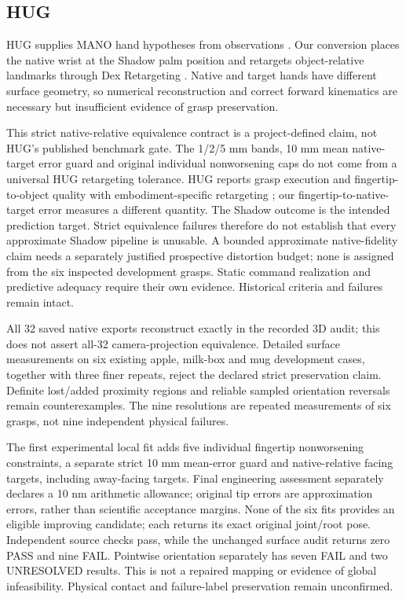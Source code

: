 \subsection{HUG}
HUG supplies MANO hand hypotheses from observations \cite{hug}. Our conversion
places the native wrist at the Shadow palm position and retargets object-relative
landmarks through Dex Retargeting \cite{dex}. Native and target hands have
different surface geometry, so numerical reconstruction and correct forward
kinematics are necessary but insufficient evidence of grasp preservation.

This strict native-relative equivalence contract is a project-defined claim,
not HUG's published benchmark gate. The 1/2/5 mm bands, 10 mm mean
native-target error guard and original individual nonworsening caps do not
come from a universal HUG retargeting tolerance. HUG reports grasp execution
and fingertip-to-object quality with embodiment-specific retargeting
\cite{hug}; our fingertip-to-native-target error measures a different quantity.
The Shadow outcome is the intended prediction target. Strict equivalence
failures therefore do not establish that every approximate Shadow pipeline is
unusable. A bounded approximate native-fidelity claim needs a separately
justified prospective distortion budget; none is assigned from the six
inspected development grasps. Static command realization and predictive
adequacy require their own evidence. Historical criteria and failures remain intact.

All 32 saved native exports reconstruct exactly in the recorded 3D audit;
this does not assert all-32 camera-projection equivalence. Detailed surface
measurements on six existing apple, milk-box and mug development cases, together
with three finer repeats, reject the declared strict preservation claim.
Definite lost/added proximity regions and reliable sampled orientation reversals
remain counterexamples. The nine resolutions are repeated measurements of six
grasps, not nine independent physical failures.

The first experimental local fit adds five individual fingertip nonworsening
constraints, a separate strict 10 mm mean-error guard and native-relative facing
targets, including away-facing targets. Final engineering assessment separately
declares a 10 nm arithmetic allowance; original tip errors are approximation
errors, rather than scientific acceptance margins. None of the six fits provides
an eligible improving candidate; each returns its exact original joint/root pose.
Independent source checks pass, while the unchanged surface audit returns zero
PASS and nine FAIL. Pointwise orientation separately has seven FAIL and two
UNRESOLVED results. This is not a repaired mapping or evidence of global
infeasibility. Physical contact and failure-label preservation remain unconfirmed.


